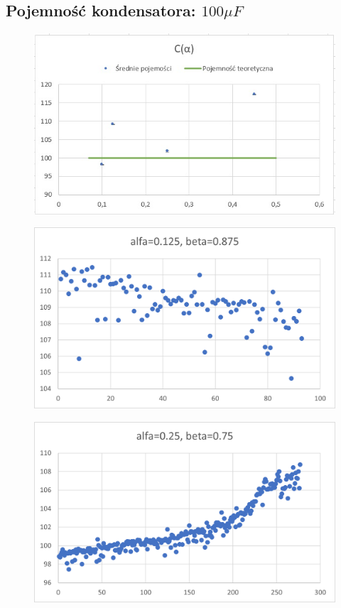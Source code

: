 \documentclass[12pt]{mwart}
\begin{document}
	\subsection{Pojemność kondensatora: $100 \mu F$}
	\begin{figure}[H]
		\centering
		\includegraphics{100_sr.jpg}
	\end{figure}
	\begin{figure}[H]
		\centering
		\includegraphics{100_a0.125.png}
	\end{figure}
	\begin{figure}[H]
		\centering
		\includegraphics{100_a0.25.png}
	\end{figure}
\end{document}
